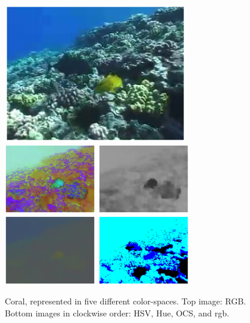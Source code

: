 \documentclass[a4paper,11pt]{article}
\begin{document}
		\begin{figure}[H]
			\begin{center}
				\includegraphics[width=8cm]{img/cs_RGB.eps}\\
				\includegraphics[width=4cm]{img/cs_HSV.eps}
				\includegraphics[width=4cm]{img/cs_Hue.eps}\\
				\includegraphics[width=4cm]{img/cs_nRGB.eps}
				\includegraphics[width=4cm]{img/cs_OCS.eps}
			\end{center}
			\caption{
				Coral, represented in five different color-spaces. Top image:
				RGB. Bottom images in clockwise order: HSV, Hue, OCS, and rgb.
			}
		\end{figure}
\end{document}
